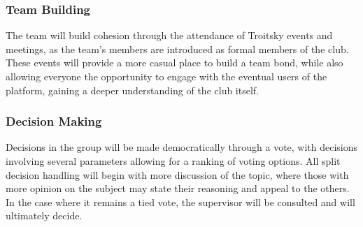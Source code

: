 \documentclass{article}
\begin{document}
\subsubsection*{Team Building}

The team will build cohesion through the attendance of Troitsky events and meetings, as the team's members are introduced as formal 
members of the club. These events will provide a more casual place to build a team bond, while also allowing everyone the opportunity to engage 
with the eventual users of the platform, gaining a deeper understanding of the club itself.

\subsubsection*{Decision Making} 

Decisions in the group will be made democratically through a vote, with decisions involving several parameters allowing for a ranking of voting options. 
All split decision handling will begin with more discussion of the topic, where those with more opinion on the subject may 
state their reasoning and appeal to the others. In the case where it remains a tied vote, the supervisor will be consulted and will ultimately
decide.
\end{document}

